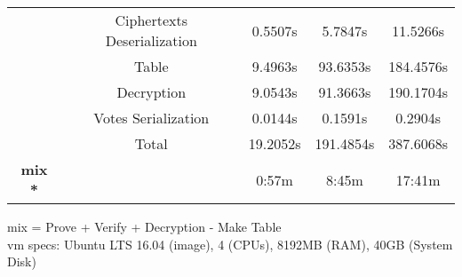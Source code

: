 \documentclass{standalone}
\begin{document}
\begin{threeparttable}
\begin{tabular}{c|c|ccc}
& Ciphertexts Deserialization & 0.5507s & 5.7847s & 11.5266s \\
& Table & 9.4963s & 93.6353s & 184.4576s \\
& Decryption & 9.0543s & 91.3663s & 190.1704s \\
& Votes Serialization & 0.0144s & 0.1591s & 0.2904s \\
\hline
& Total & 19.2052s & 191.4854s & 387.6068s \\
\hline
\hline
\textbf{mix *} & & 0:57m & 8:45m & 17:41m \\
\hline
\hline
\end{tabular}
\begin{tablenotes}
\small
\item * mix = Prove + Verify + Decryption - Make Table \\
vm specs: Ubuntu LTS 16.04 (image), 4 (CPUs), 8192MB (RAM), 40GB (System Disk)
\end{tablenotes}
\end{threeparttable}
\end{document}
